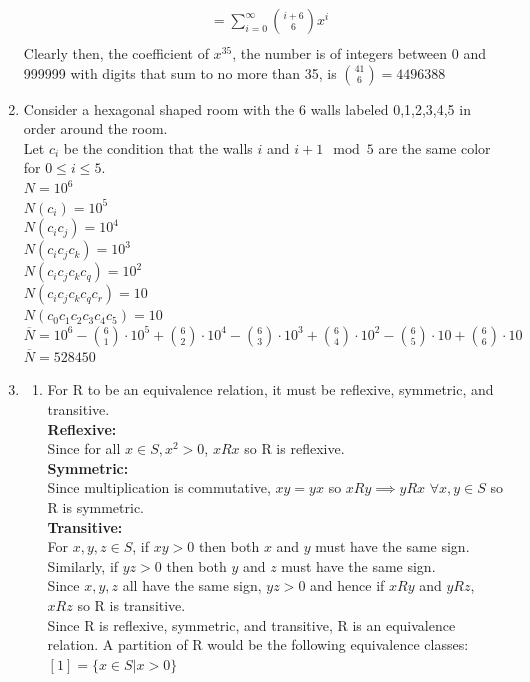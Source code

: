 \documentclass[11pt]{article}
\begin{document}
\begin{enumerate}[]
\begin{align}
		&=\sum_{i=0}^{\infty} \binom{i+6}{6}x^i \nonumber\\
	\end{align}
Clearly then, the coefficient of $x^{35}$, the number is of integers between 0 and 999999 with digits that sum to no more than 35, is $\binom{41}{6} = 4496388$
\item
Consider a hexagonal shaped room with the 6 walls labeled 0,1,2,3,4,5 in order around the room.\\
Let $c_i$ be the condition that the walls $i$ and $i+1\mod 5$ are the same color for $0\leq i\leq5$.\\
$N=10^6$\\
$N(c_i)=10^5$\\
$N({c_i}{c_j})=10^4$\\
$N({c_i}{c_j}{c_k})=10^3$\\
$N({c_i}{c_j}{c_k}{c_q})=10^2$\\
$N({c_i}{c_j}{c_k}{c_q}{c_r})=10$\\
$N({c_0}{c_1}{c_2}{c_3}{c_4}{c_5})=10$\\
$\overline{N} = 10^6 - \binom{6}{1}\cdot 10^5 + \binom{6}{2}\cdot 10^4 - \binom{6}{3}\cdot 10^3 + \binom{6}{4}\cdot 10^2 - \binom{6}{5}\cdot 10 + \binom{6}{6}\cdot 10$\\
$\overline{N} = 528450$
\item
	\begin{enumerate}[label=\alph*]
	\item For R to be an equivalence relation, it must be reflexive, symmetric, and transitive.\\
	\textbf{Reflexive:}\\
	Since for all $x\in S, x^2 > 0$, $xRx$ so R is reflexive.\\
	\textbf{Symmetric:}\\
	Since multiplication is commutative, $xy=yx$ so $xRy \implies yRx$ $\forall x,y\in S$ so R is symmetric. \\
	\textbf{Transitive:}\\
	For $x,y,z\in S$, if $xy>0$ then both $x$ and $y$ must have the same sign. Similarly, if $yz>0$ then both $y$ and $z$ must have the same sign.\\
	Since $x,y,z$ all have the same sign, $yz>0$ and hence if $xRy$ and $yRz$, $xRz$ so R is transitive. \\
	Since R is reflexive, symmetric, and transitive, R is an equivalence relation.
	A partition of R would be the following equivalence classes:\\
	$[1] = \{x\in S | x > 0\}$\\

\end{enumerate}
\end{enumerate}
\end{document}
